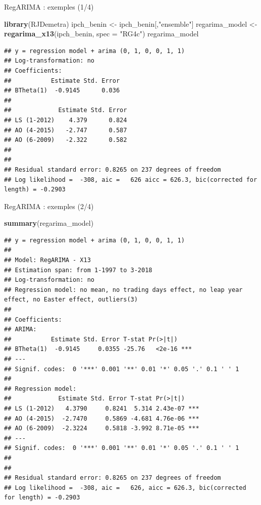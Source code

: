 \documentclass[10pt,xcolor=table,color={dvipsnames,usenames},ignorenonframetext,usepdftitle=false,french]{beamer}
\newenvironment{Shaded}{\begin{snugshade}}{\end{snugshade}}
\newcommand{\DataTypeTok}[1]{\textcolor[rgb]{0.13,0.29,0.53}{#1}}
\newcommand{\KeywordTok}[1]{\textcolor[rgb]{0.13,0.29,0.53}{\textbf{#1}}}
\newcommand{\NormalTok}[1]{#1}
\newcommand{\StringTok}[1]{\textcolor[rgb]{0.31,0.60,0.02}{#1}}
\begin{document}
\begin{frame}[fragile]{RegARIMA : exemples (1/4)}
\protect\hypertarget{regarima-exemples-14}{}

\begin{Shaded}
\begin{Highlighting}[]
\KeywordTok{library}\NormalTok{(RJDemetra)}
\NormalTok{ipch_benin <-}\StringTok{ }\NormalTok{ipch_benin[,}\StringTok{"ensemble"}\NormalTok{]}
\NormalTok{regarima_model <-}\StringTok{ }\KeywordTok{regarima_x13}\NormalTok{(ipch_benin, }\DataTypeTok{spec =} \StringTok{"RG4c"}\NormalTok{)}
\NormalTok{regarima_model}
\end{Highlighting}
\end{Shaded}

\begin{verbatim}
## y = regression model + arima (0, 1, 0, 0, 1, 1)
## Log-transformation: no
## Coefficients:
##           Estimate Std. Error
## BTheta(1)  -0.9145      0.036
## 
##             Estimate Std. Error
## LS (1-2012)    4.379      0.824
## AO (4-2015)   -2.747      0.587
## AO (6-2009)   -2.322      0.582
## 
## 
## Residual standard error: 0.8265 on 237 degrees of freedom
## Log likelihood =  -308, aic =   626 aicc = 626.3, bic(corrected for length) = -0.2903
\end{verbatim}

\end{frame}

\begin{frame}[fragile]{RegARIMA : exemples (2/4)}
\protect\hypertarget{regarima-exemples-24}{}

\footnotesize

\begin{Shaded}
\begin{Highlighting}[]
\KeywordTok{summary}\NormalTok{(regarima_model)}
\end{Highlighting}
\end{Shaded}

\begin{verbatim}
## y = regression model + arima (0, 1, 0, 0, 1, 1)
## 
## Model: RegARIMA - X13
## Estimation span: from 1-1997 to 3-2018
## Log-transformation: no
## Regression model: no mean, no trading days effect, no leap year effect, no Easter effect, outliers(3)
## 
## Coefficients:
## ARIMA: 
##           Estimate Std. Error T-stat Pr(>|t|)    
## BTheta(1)  -0.9145     0.0355 -25.76   <2e-16 ***
## ---
## Signif. codes:  0 '***' 0.001 '**' 0.01 '*' 0.05 '.' 0.1 ' ' 1
## 
## Regression model: 
##             Estimate Std. Error T-stat Pr(>|t|)    
## LS (1-2012)   4.3790     0.8241  5.314 2.43e-07 ***
## AO (4-2015)  -2.7470     0.5869 -4.681 4.76e-06 ***
## AO (6-2009)  -2.3224     0.5818 -3.992 8.71e-05 ***
## ---
## Signif. codes:  0 '***' 0.001 '**' 0.01 '*' 0.05 '.' 0.1 ' ' 1
## 
## 
## Residual standard error: 0.8265 on 237 degrees of freedom
## Log likelihood =  -308, aic =   626, aicc = 626.3, bic(corrected for length) = -0.2903
\end{verbatim}

\end{frame}
\end{document}
